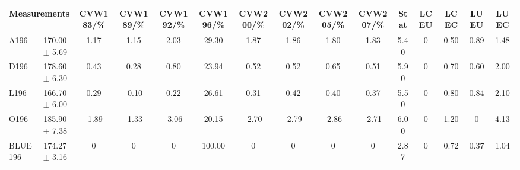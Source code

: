 \begin{table}[H]
\scriptsize
\begin{center}
\renewcommand{\arraystretch}{1.1}
\begin{tabular}{|lc|c|c|c|c|c|c|c|c|ccccc|}
\hline
\multicolumn{2}{|c|}{Measurements} & CVW{\tiny 183}/\%  & CVW{\tiny 189}/\%  & CVW{\tiny 192}/\%  & CVW{\tiny 196}/\%  & CVW{\tiny 200}/\%  & CVW{\tiny 202}/\%  & CVW{\tiny 205}/\%  & CVW{\tiny 207}/\%  & {\tiny Stat} & {\tiny LCEU} & {\tiny LCEC} & {\tiny LUEU} & {\tiny LUEC}\\
\hline
A196 &     170.00 $\pm$       5.69 &       1.17 &       1.15 &       2.03 &      29.30 &       1.87 &       1.86 &       1.80 &       1.83 &       5.40 &  0 &       0.50 &       0.89 &       1.48\\
D196 &     178.60 $\pm$       6.30 &       0.43 &       0.28 &       0.80 &      23.94 &       0.52 &       0.52 &       0.65 &       0.51 &       5.90 &  0 &       0.70 &       0.60 &       2.00\\
L196 &     166.70 $\pm$       6.00 &       0.29 &      -0.10 &       0.22 &      26.61 &       0.31 &       0.42 &       0.40 &       0.37 &       5.50 &  0 &       0.80 &       0.84 &       2.10\\
O196 &     185.90 $\pm$       7.38 &      -1.89 &      -1.33 &      -3.06 &      20.15 &      -2.70 &      -2.79 &      -2.86 &      -2.71 &       6.00 &  0 &       1.20 &  0 &       4.13\\
\hline
BLUE {\tiny 196} &     174.27 $\pm$       3.16 &  0 &  0 &  0 &     100.00 &  0 &  0 &  0 &  0 &       2.87 &  0 &       0.72 &       0.37 &       1.04\\
\hline
\end{tabular}
\renewcommand{\arraystretch}{1}
\end{center}
\end{table}
\vspace*{-0.5cm}
